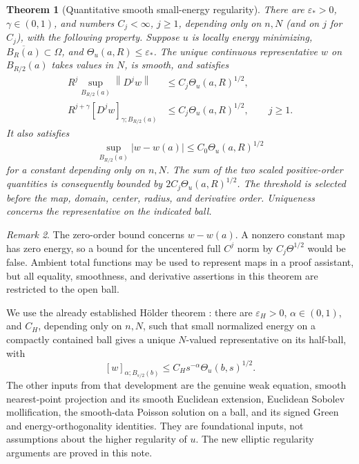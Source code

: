 \documentclass[11pt,a4paper]{article}
\numberwithin{equation}{section}
\newtheorem{theorem}{Theorem}[section]
\theoremstyle{definition}
\theoremstyle{remark}
\newtheorem{remark}[theorem]{Remark}
\newcommand{\norm}[1]{\left\lVert#1\right\rVert}
\newcommand{\Th}{\Theta}
\begin{document}
\begin{theorem}[Quantitative smooth small-energy regularity]
\label{thm:main}
There are \(\varepsilon_*>0\), \(\gamma\in(0,1)\), and numbers
\(C_j<\infty\), \(j\ge1\), depending only on \(n,N\) (and on \(j\)
for \(C_j\)), with the following property. Suppose \(u\) is locally energy
minimizing, \(\overline{B_R(a)}\subset\Omega\), and
\(\Th_u(a,R)\le\varepsilon_*\). The unique continuous representative
\(w\) on \(B_{R/2}(a)\) takes values in \(N\), is smooth, and satisfies
\begin{equation}\label{eq:main}
 \begin{aligned}
 R^j\sup_{B_{R/2}(a)}\norm{D^jw}
 &\le C_j\Th_u(a,R)^{1/2},\\
 R^{j+\gamma}[D^jw]_{\gamma;B_{R/2}(a)}
 &\le C_j\Th_u(a,R)^{1/2},\qquad j\ge1.
 \end{aligned}
\end{equation}
It also satisfies
\begin{equation}\label{eq:zero}
 \sup_{B_{R/2}(a)}|w-w(a)|\le C_0\Th_u(a,R)^{1/2}
\end{equation}
for a constant depending only on \(n,N\). The sum of the two scaled
positive-order quantities is consequently bounded by
\(2C_j\Th_u(a,R)^{1/2}\). The threshold is selected before
the map, domain, center, radius, and derivative order. Uniqueness concerns
the representative on the indicated ball.
\end{theorem}

\begin{remark}
The zero-order bound concerns \(w-w(a)\). A nonzero constant map has zero
energy, so a bound for the uncentered full \(C^j\) norm by
\(C_j\Th^{1/2}\) would be false. Ambient total functions may be used to
represent maps in a proof assistant, but all equality, smoothness, and
derivative assertions in this theorem are restricted to the open ball.
\end{remark}

We use the already established H\"older theorem \cite{Holder}: there are
\(\varepsilon_H>0\), \(\alpha\in(0,1)\), and \(C_H\), depending only on
\(n,N\), such that small normalized energy on a compactly contained ball
gives a unique \(N\)-valued representative on its half-ball, with
\[
 [w]_{\alpha;B_{s/2}(b)}
 \le C_Hs^{-\alpha}\Th_u(b,s)^{1/2}.
\]
The other inputs from that development are the genuine weak equation,
smooth nearest-point projection and its smooth Euclidean extension,
Euclidean Sobolev mollification, the smooth-data Poisson solution on a ball,
and its signed Green and energy-orthogonality identities. They are
foundational inputs, not assumptions about the higher regularity of \(u\).
The new elliptic regularity arguments are proved in this note.
\end{document}
